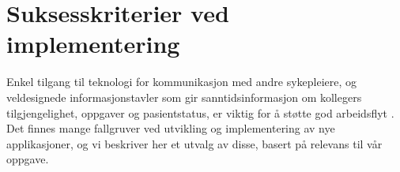 \section{Suksesskriterier ved implementering}
\label{chp: suksesskriterier}


\noindent
Enkel tilgang til teknologi for kommunikasjon med andre sykepleiere, og veldesignede informasjonstavler som gir sanntidsinformasjon om kollegers tilgjengelighet, oppgaver og pasientstatus, er viktig for å støtte god arbeidsflyt \cite{Ebright10}. 
Det finnes  mange fallgruver ved utvikling og implementering av nye applikasjoner, og vi beskriver her et utvalg av disse, basert på relevans til vår oppgave.


